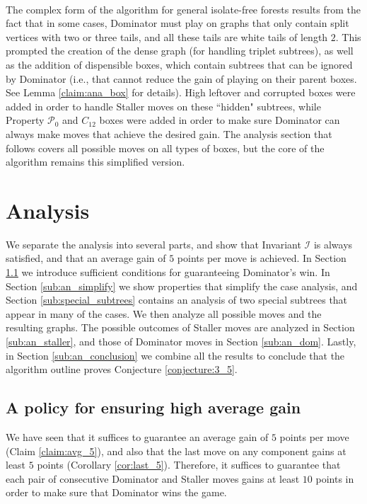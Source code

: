 \documentclass[11pt]{article}
\theoremstyle{definition}
\def\propt1{\mathcal{P}_0}
\def\invboxes{\mathcal{I}}
\begin{document}
\paragraph{}
The complex form of the algorithm for general isolate-free forests results from the fact that in some cases, Dominator must play on graphs that only contain split vertices with two or three tails, and all these tails are white tails of length $2$. 
This prompted the creation of the dense graph (for handling triplet subtrees), as well as the addition of dispensible boxes, which contain subtrees that can be ignored by Dominator (i.e., that cannot reduce the gain of playing on their parent boxes. See Lemma \ref{claim:ana_box} for details). 
High leftover and corrupted boxes were added in order to handle Staller moves on these ``hidden" subtrees, while Property $\propt1$ and $C_{12}$ boxes were added in order to make sure Dominator can always make moves that achieve the desired gain.
The analysis section that follows covers all possible moves on all types of boxes, but the core of the algorithm remains this simplified version.


\section{Analysis}
\label{section:analysis}

We separate the analysis into several parts, and show that Invariant $\invboxes$ is always satisfied, and that an average gain of $5$ points per move is achieved.
In Section \ref{sub:an_gain} we introduce sufficient conditions for guaranteeing Dominator's win.
In Section \ref{sub:an_simplify}  we show properties that simplify the case analysis,
and Section \ref{sub:special_subtrees} contains an analysis of two special subtrees that appear in many of the cases. 
We then analyze all possible moves and the resulting graphs.
The possible outcomes of Staller moves are analyzed in Section \ref{sub:an_staller}, 
and those of Dominator moves in Section \ref{sub:an_dom}.
Lastly, in Section \ref{sub:an_conclusion} we combine all the results to conclude that the algorithm outline proves Conjecture \ref{conjecture:3_5}.

\subsection{A policy for ensuring high average gain}
\label{sub:an_gain}

We have seen that it suffices to guarantee an average gain of $5$ points per move (Claim \ref{claim:avg_5}), 
and also that the last move on any component gains at least $5$ points (Corollary \ref{cor:last_5}).
Therefore, it suffices to guarantee that each pair of consecutive Dominator and Staller moves gains at least $10$ points in order to make sure that Dominator wins the game.
\end{document}
